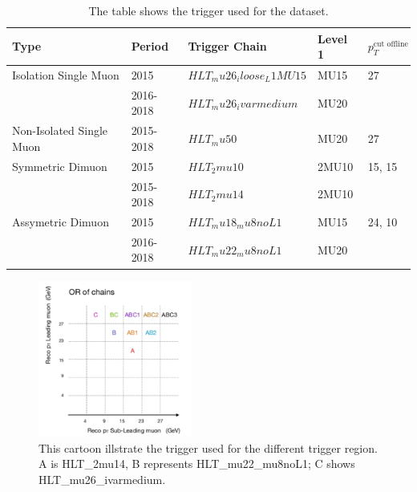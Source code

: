 \begin{table}[!htb]
    \begin{center}
    \caption{
        The table shows the trigger used for the dataset.
    }
\label{tab:Data Trigger}
\begin{tabular}{|l|l|l|l|l}
\hline
\textbf{Type}   & \textbf{Period}                                                         &\textbf{Trigger Chain} &\textbf{Level 1} &\textbf{$p_{T}^{\textrm{cut offline}}$}\\ \hline
Isolation Single Muon   & 2015 & $HLT_mu26_iloose_L1MU15$ & MU15 & 27 \\ 
                        & 2016-2018  & $HLT_mu26_ivarmedium$    & MU20 & \\ \hline
Non-Isolated Single Muon & 2015-2018                                       &$HLT_mu50$& MU20& 27 \\ \hline
Symmetric Dimuon & 2015 & $HLT_2mu10$ & 2MU10 & 15, 15 \\
                 & 2015-2018 & $HLT_2mu14$ & 2MU10 & \\ \hline
Assymetric Dimuon & 2015 & $HLT_mu18_mu8noL1$ & MU15 & 24, 10 \\
                  & 2016-2018 & $HLT_mu22_mu8noL1$ & MU20 \\ \hline
\end{tabular}
\end{center}
\end{table}

\begin{figure}[!htb]
    \begin{center}
        \includegraphics[width=0.45\textwidth]{figures/chapter_dimuon/TriggerChain}        
        \caption{
        This cartoon illstrate the trigger used for the different trigger region. A is HLT\_2mu14, B represents HLT\_mu22\_mu8noL1; C shows HLT\_mu26\_ivarmedium. }
    \end{center}
\end{figure}

